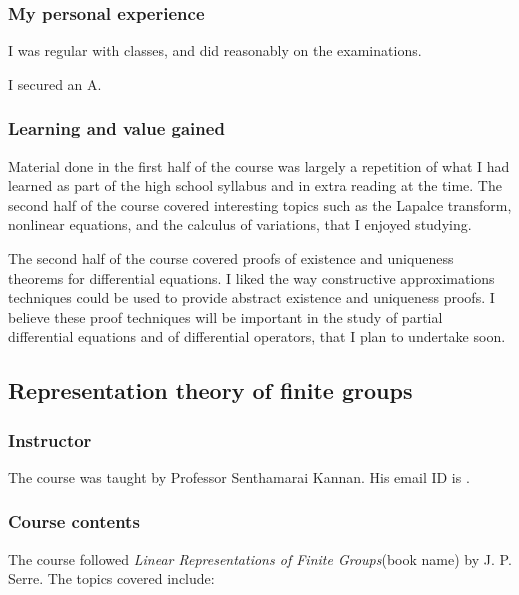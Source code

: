 \documentclass[a4paper]{amsart}
\newcommand{\bookname}[1]{{\em #1}{\small{(book name)}}}
\begin{document}
\subsubsection{My personal experience}

I was regular with classes, and did reasonably on  the examinations.

I secured an A.

\subsubsection{Learning and value gained}

Material done in the first half of the course was largely a repetition
of what I had learned as part of the high school syllabus and in extra
reading at the time. The second half of the course covered interesting
topics such as the Lapalce transform, nonlinear equations, and the
calculus of variations, that I enjoyed studying.

The second half of the course covered proofs of existence and
uniqueness theorems for differential equations. I liked the way
constructive approximations techniques could be used to provide
abstract existence and uniqueness proofs. I believe these proof
techniques will be important in the study of partial differential
equations and of differential operators, that I plan to undertake
soon.

\subsection{Representation theory of finite groups}

\subsubsection{Instructor}

The course was taught by Professor Senthamarai Kannan. His email ID is .

\subsubsection{Course contents}

The course followed \bookname{Linear Representations of Finite Groups} by
J. P. Serre. The topics covered include:
\end{document}
